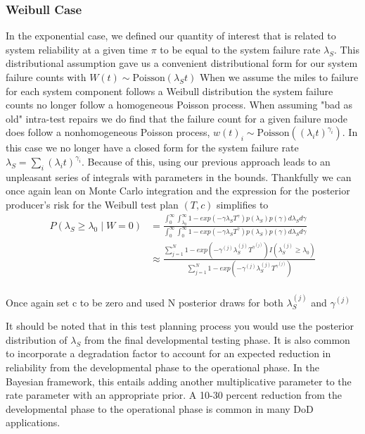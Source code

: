 \documentclass[12pt]{article}
\begin{document}
\subsubsection{Weibull Case}
In the exponential case, we defined our quantity of interest that is related to
system reliability at a given time $\pi$ to be equal to the system failure rate
$\lambda_S$.  This distributional assumption gave us a convenient distributional
form for our system failure counts with $W(t) \sim \text{Poisson}(\lambda_S t)$
When we assume the miles to failure for each system component follows a Weibull
distribution the system failure counts no longer follow a homogeneous Poisson
process.  When assuming "bad as old" intra-test repairs we do find that the
failure count for a given failure mode does follow a nonhomogeneous Poisson
process, $w(t)_i \sim \text{Poisson}( (\lambda_i t)^{\gamma_i} )$.  In this case
we no longer have a closed form for the system failure rate $\lambda_S = \sum_i
(\lambda_i t)^{\gamma_i}$.  Because of this, using our previous approach leads to
an unpleasant series of integrals with parameters in the bounds.  Thankfully we
can once again lean on Monte Carlo integration and the expression for the
posterior producer's risk for the Weibull test plan $(T,c)$ simplifies to
$$
\begin{aligned}
	 P(\lambda_S \geq \lambda_0 \; \vert \; W = 0) &= \frac{\int_{0}^{\infty}
	 \int_{\lambda_0}^{\infty} 1 - exp(- \gamma \lambda_S T^{\gamma})p(\lambda_S)
	 p(\gamma) d\lambda_S d\gamma} {\int_{0}^{\infty} \int_{0}^{\infty} 1 - exp(-
	 \gamma \lambda_S T^{\gamma})p(\lambda_S) p(\gamma) d\lambda_S d\gamma} \\
	 &\approx \frac{\sum_{j = 1}^{N} 1 - exp(-\gamma^{(j)} \lambda_S^{(j)}
	 T^{\gamma^{(j)}}) I(\lambda_S^{(j)} \geq \lambda_0)} {\sum_{j = 1}^{N} 1 -
	 exp(- \gamma^{(j)} \lambda_S^{(j)} T^{\gamma^{(j)}})}
\end{aligned}
$$
\\
Once again set c to be zero and used N posterior draws for both
$\lambda_S^{(j)}$ and $\gamma^{(j)}$

It should be noted that in this test planning process you would use the
posterior distribution of $\lambda_S$ from the final developmental testing
phase.  It is also common to incorporate a degradation factor to account for an
expected reduction in reliability from the developmental phase to the
operational phase.  In the Bayesian framework, this entails adding another
multiplicative parameter to the rate parameter with an appropriate prior.   A
10-30 percent reduction from the developmental phase to the operational phase is
common in many DoD applications.
\end{document}
